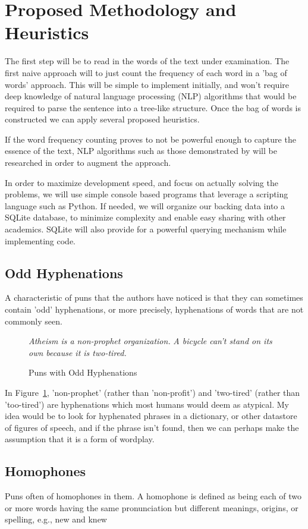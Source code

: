 
\section{Proposed Methodology and Heuristics}
The first step will be to read in the words of the text under examination. The first naive approach will to just count the frequency of each word in a 'bag of words' approach. This will be simple to implement initially, and won't require deep knowledge of natural language processing (NLP) algorithms that would be required to parse the sentence into a tree-like structure. Once the bag of words is constructed we can apply several proposed heuristics.

If the word frequency counting proves to not be powerful enough to capture the essence of the text, NLP algorithms such as those demonstrated by \cite{stanfordparser} will be researched in order to augment the approach. 

In order to maximize development speed, and focus on actually solving the problems, we will use simple console based programs that leverage a scripting language such as Python. If needed, we will organize our backing data into a SQLite database, to minimize complexity and enable easy sharing with other academics. SQLite will also provide for a powerful querying mechanism while implementing code.

\subsection{Odd Hyphenations}
A characteristic of puns that the authors have noticed is that they can sometimes contain 'odd' hyphenations, or more precisely, hyphenations of words that are not commonly seen.

\begin{figure}[h]
  \caption{Puns with Odd Hyphenations}
  \emph{Atheism is a non-prophet organization.}
  \emph{A bicycle can't stand on its own because it is two-tired.}
 \label{oddhyphen}
\end{figure}

In Figure~\ref{oddhyphen}, 'non-prophet' (rather than 'non-profit') and 'two-tired' (rather than 'too-tired') are hyphenations which most humans would deem as atypical. My idea would be to look for hyphenated phrases in a dictionary, or other datastore of figures of speech, and if the phrase isn't found, then we can perhaps make the assumption that it is a form of wordplay. 

\subsection{Homophones}
Puns often of homophones in them. A homophone is defined as being each of two or more words having the same pronunciation but different meanings, origins, or spelling, e.g., new and knew

